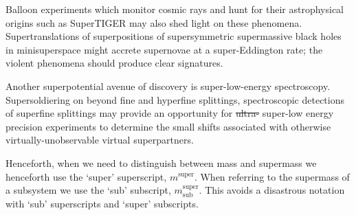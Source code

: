 Balloon experiments which monitor cosmic rays and hunt for their astrophysical origins such as SuperTIGER\cite{Binns:2014xpa} may also shed light on these phenomena.
Supertranslations of superpositions of supersymmetric supermassive black holes in minisuperspace might accrete supernovae at a super-Eddington rate; the violent phenomena should produce clear signatures.

Another superpotential avenue of discovery is super-low-energy spectroscopy.
Supersoldiering on beyond fine and hyperfine splittings, spectroscopic detections of superfine splittings may provide an opportunity for \st{ultra-} super-low energy precision experiments to determine the small shifts associated with otherwise virtually-unobservable virtual superpartners.

Henceforth, when we need to distinguish between mass and supermass we henceforth use the `super' superscript, $m^{\text{super}}$.  When referring to the supermass of a subsystem we use the `sub' subscript, $m^{\text{super}}_{\text{sub}}$.  This avoids a disastrous notation with `sub' superscripts and `super' subscripts.
